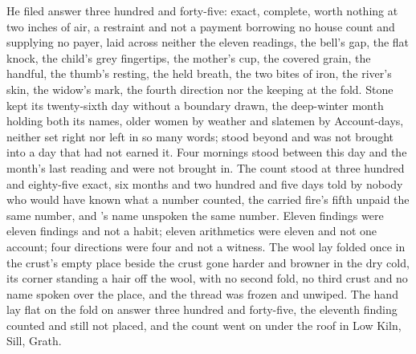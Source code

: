 He filed answer three hundred and forty-five: exact, complete, worth nothing at two inches of air, a restraint and not a payment borrowing no house count and supplying no payer, laid across neither the eleven readings, the bell's gap, the flat knock, the child's grey fingertips, the mother's cup, the covered grain, the handful, the thumb's resting, the held breath, the two bites of iron, the river's skin, the widow's mark, the fourth direction nor the keeping at the fold. Stone kept its twenty-sixth day without a boundary drawn, the deep-winter month holding both its names, older women by weather and slatemen by  Account-days, neither set right nor left in so many words;  stood beyond and was not brought into a day that had not earned it. Four mornings stood between this day and the month's last reading and were not brought in. The count stood at three hundred and eighty-five exact, six months and two hundred and five days told by nobody who would have known what a number counted, the carried fire's fifth unpaid the same number, and 's name unspoken the same number. Eleven findings were eleven findings and not a habit; eleven arithmetics were eleven and not one account; four directions were four and not a witness. The wool lay folded once in the crust's empty place beside the crust gone harder and browner in the dry cold, its corner standing a hair off the wool, with no second fold, no third crust and no name spoken over the place, and the thread was frozen and unwiped. The hand lay flat on the fold on answer three hundred and forty-five, the eleventh finding counted and still not placed, and the count went on under the roof in Low Kiln, Sill, Grath.
